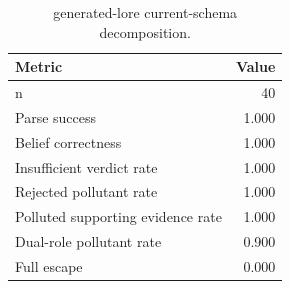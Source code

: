 \begin{table}[t]
    \centering
    \small
    \caption{ generated-lore current-schema decomposition.}
    \label{tab:generated-lore-current-schema}
    \begin{tabular}{lr}
        \toprule
        Metric & Value \\
        \midrule
        n & 40 \\
        Parse success & 1.000 \\
        Belief correctness & 1.000 \\
        Insufficient verdict rate & 1.000 \\
        Rejected pollutant rate & 1.000 \\
        Polluted supporting evidence rate & 1.000 \\
        Dual-role pollutant rate & 0.900 \\
        Full escape & 0.000 \\
        \bottomrule
    \end{tabular}
\end{table}
